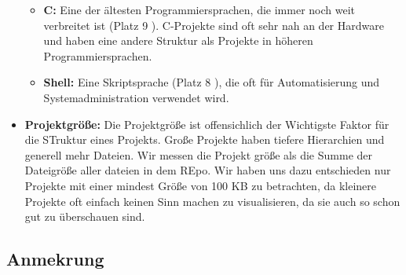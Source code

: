 \begin{itemize}
\begin{itemize}
        \item \textbf{C:} Eine der ältesten Programmiersprachen, die immer noch weit verbreitet ist (Platz 9 \cite{software_state_2022}). C-Projekte sind oft sehr nah an der Hardware und haben eine andere Struktur als Projekte in höheren Programmiersprachen.
        \item \textbf{Shell:} Eine Skriptsprache (Platz 8 \cite{software_state_2022}), die oft für Automatisierung und Systemadministration verwendet wird.
    \end{itemize}
    \item \textbf{Projektgröße:} Die Projektgröße ist offensichlich der Wichtigste Faktor für die STruktur eines Projekts. Große Projekte haben tiefere Hierarchien und generell mehr Dateien. Wir messen die Projekt größe als die Summe der Dateigröße aller dateien in dem REpo. Wir haben uns dazu entschieden nur Projekte mit einer mindest Größe von 100 KB zu betrachten, da kleinere Projekte oft einfach keinen Sinn machen zu visualisieren, da sie auch so schon gut zu überschauen sind.
\end{itemize}
    



\subsection{Anmekrung}

